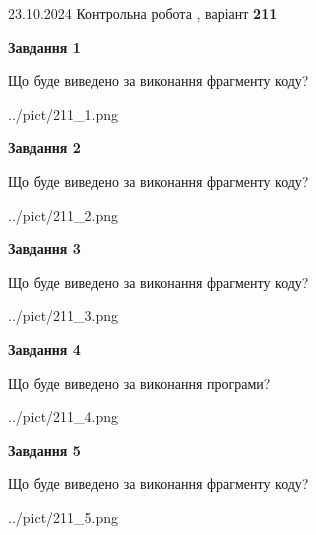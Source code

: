 \documentclass[12pt, ukrainian]{article}
\begin{document}
{\Large{23.10.2024 Контрольна робота , варіант  \No \textbf { 211 }\par}}
{
\begin {large}
{\begin {center}\textbf{Завдання 1}\end {center}}

Що буде виведено за виконання фрагменту коду?\par
\begin{center}
	{../pict/211_1.png}
\end{center}
\newpage

{\begin {center}\textbf{Завдання 2}\end {center}}

Що буде виведено за виконання фрагменту коду?\par
\begin{center}
	{../pict/211_2.png}
\end{center}
\newpage

{\begin {center}\textbf{Завдання 3}\end {center}}

Що буде виведено за виконання фрагменту коду?\par
\begin{center}
	{../pict/211_3.png}
\end{center}
\newpage

{\begin {center}\textbf{Завдання 4}\end {center}}

Що буде виведено за виконання програми?\par
\begin{center}
	{../pict/211_4.png}
\end{center}
\newpage

{\begin {center}\textbf{Завдання 5}\end {center}}

Що буде виведено за виконання фрагменту коду?\par
\begin{center}
	{../pict/211_5.png}
\end{center}
\newpage


\end{large}}
\end{document}
